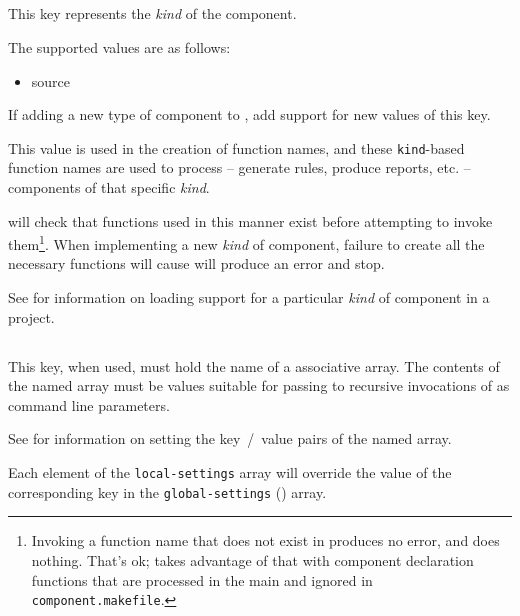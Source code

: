 \subsection{}\label{variables:kind}

This key represents the \emph{kind} of the component.

The supported values are as follows:

\begin{itemize}
\item source
\end{itemize}

If adding a new type of component to \lmsbw, add support for new
values of this key.

This value is used in the creation of function names, and these
\texttt{kind}-based function names are used to process -- generate
rules, produce reports, etc. -- components of that specific
\emph{kind}.

\lmsbw will check that functions used in this manner exist before
attempting to invoke them\footnote{Invoking a function name that does
  not exist in \gnumake produces no error, and does nothing.  That's
  ok; \lmsbw takes advantage of that with component declaration
  functions that are processed in the main \makefile and ignored in
  \texttt{component.makefile}.}.  When implementing a new \emph{kind}
of component, failure to create all the necessary functions will cause
\lmsbw will produce an error and stop.

See  for information on
loading support for a particular \emph{kind} of component in a
project.


\subsection{}\label{variables:local-settings}

This key, when used, must hold the name of a \gmsl associative array.
The contents of the named array must be values suitable for passing to
recursive invocations of \make as command line parameters.

See  for information on setting the
key~/~value pairs of the named array.

Each element of the \texttt{local-settings} array will override the
value of the corresponding key in the \texttt{global-settings}
() array.

